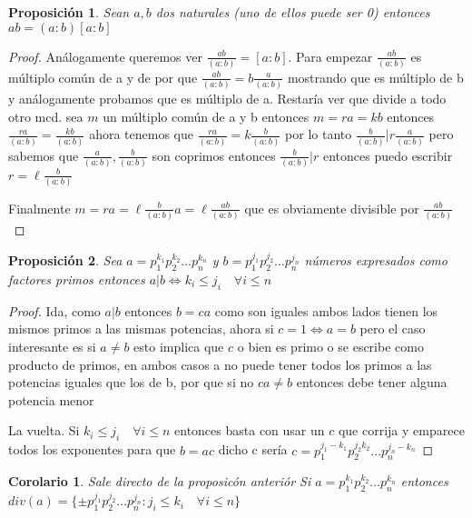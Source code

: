 \documentclass{article}
\theoremstyle{break}
\newtheorem{corollary}{Corolario}[theorem]
\newtheorem{proposition}{Proposición}
\begin{document}
    \begin{proposition}
        Sean $a,b$ dos naturales (uno de ellos puede ser 0) entonces $ab=(a:b)[a:b]$
    \end{proposition}
    \begin{proof}
        Análogamente queremos ver $\frac{ab}{(a:b)} = [a:b] $. Para empezar $\frac{ab}{(a:b)}$ es múltiplo común de a y de por que
        $\frac{ab}{(a:b)} = b\frac{a}{(a:b)}$ mostrando que es múltiplo de b y análogamente probamos que es múltiplo de a.
        Restaría ver que divide a todo otro mcd.
        sea $m$ un múltiplo común de a y b entonces $m=ra=kb$ entonces $\frac{ra}{(a:b)} = \frac{kb}{(a:b)}$ ahora tenemos que $\frac{ra}{(a:b)} = k\frac{b}{(a:b)}$
        por lo tanto $\frac{b}{(a:b)} | r\frac{a}{(a:b)}$ pero sabemos que $\frac{a}{(a:b)}, \frac{b}{(a:b)}$ son coprimos
        entonces $\frac{b}{(a:b)} | r$ entonces puedo escribir $r = \ell\frac{b}{(a:b)} $
        
        Finalmente $m = ra = \ell\frac{b}{(a:b)} a = \ell\frac{ab}{(a:b)} $ que es obviamente divisible por $\frac{ab}{(a:b)}$
    \end{proof}

    \begin{proposition}
        Sea $a = p_1^{k_1}p_2^{k_2}\ldots p_n^{k_n}$ y $b = p_1^{j_1}p_2^{j_2}\ldots p_n^{j_n}$ números expresados como factores primos
        entonces $a|b \iff k_i\leq j_i \quad \forall i\leq n$
    \end{proposition}

    \begin{proof}
        Ida, como $a|b$ entonces $b=ca$ como son iguales ambos lados tienen los mismos primos a las mismas potencias, ahora si $c=1 \iff a=b$
        pero el caso interesante es si $a\neq b$ esto implica que $c$ o bien es primo o se escribe como producto de primos, en ambos
        casos a no puede tener todos los primos a las potencias iguales que los de b, por que si no $ca\neq b$ entonces debe tener 
        alguna potencia menor

        La vuelta. Si $k_i \leq j_i \quad \forall i\leq n$ entonces basta con usar un $c$ que corrija y emparece todos los exponentes
        para que $b=ac$ dicho c sería $c= p_1^{j_1-k_1}p_2^{j_2k_2}\ldots p_n^{j_n-k_n} $
    \end{proof}

    \begin{corollary}
        Sale directo de la proposicón anteriór 
        Si $a=p_1^{k_1}p_2^{k_2}\ldots p_n^{k_n}$ entonces 
        $div(a) = \{\pm p_1^{j_1}p_2^{j_2}\ldots p_n^{j_n} : j_i \leq k_i \quad \forall i \leq n\}$
    \end{corollary}
\end{document}
